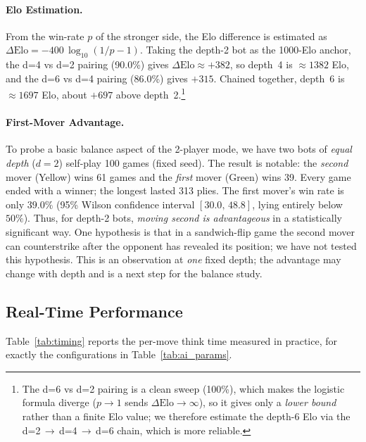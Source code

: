 \paragraph{Elo Estimation.}
From the win-rate $p$ of the stronger side, the Elo difference is estimated
as $\Delta\mathrm{Elo} = -400\,\log_{10}(1/p - 1)$. Taking the depth-2 bot
as the 1000-Elo anchor, the d=4 vs d=2 pairing (90.0\%) gives
$\Delta\mathrm{Elo}\approx{+}382$, so depth~4 is $\approx 1382$ Elo, and the
d=6 vs d=4 pairing (86.0\%) gives ${+}315$. Chained together, depth~6 is
$\approx 1697$ Elo, about ${+}697$ above depth~2.\footnote{The d=6 vs d=2 pairing is a clean sweep (100\%),
which makes the logistic formula diverge ($p\to1$ sends
$\Delta\mathrm{Elo}\to\infty$), so it gives only a \emph{lower bound} rather
than a finite Elo value; we therefore estimate the depth-6 Elo via the
d=2\,$\to$\,d=4\,$\to$\,d=6 chain, which is more reliable.}

\paragraph{First-Mover Advantage.}
To probe a basic balance aspect of the 2-player mode, we have two bots of
\emph{equal depth} ($d{=}2$) self-play 100 games (fixed seed). The result is
notable: the \emph{second} mover (Yellow) wins 61 games and the \emph{first}
mover (Green) wins 39. Every game ended with a winner; the longest lasted
313 plies. The first mover's win rate is only $39.0\%$ (95\% Wilson
confidence interval $[30.0,\,48.8]$, lying entirely below $50\%$). Thus, for depth-2 bots,
\emph{moving second is advantageous} in a statistically significant way.
One hypothesis is that in a sandwich-flip game the second mover can
counterstrike after the opponent has revealed its position; we have not
tested this hypothesis. This
is an observation at \emph{one} fixed depth; the advantage may change with
depth and is a next step for the balance study.

\subsection{Real-Time Performance}
\label{sec:eval_timing}

Table~\ref{tab:timing} reports the per-move think time measured in
practice, for exactly the configurations in Table~\ref{tab:ai_params}.

